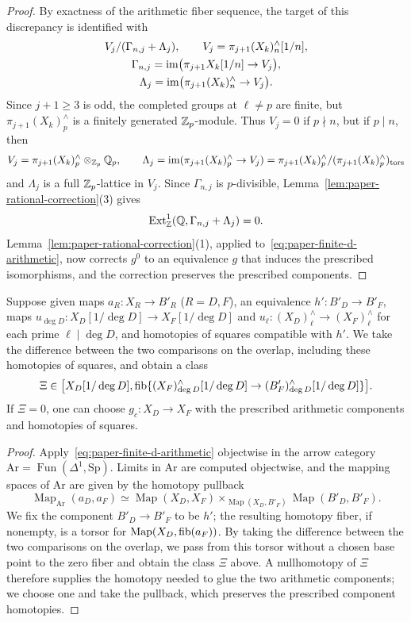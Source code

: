 \begin{proof}
By exactness of the arithmetic fiber sequence, the target of this discrepancy is identified with
\[
 \begin{gathered}
 V_j/(\Gamma_{n,j}+\Lambda_j),\qquad V_j=\pi_{j+1}(X_k)^\wedge_n[1/n],\\
 \Gamma_{n,j}=\operatorname{im}\bigl(\pi_{j+1}X_k[1/n]\to V_j\bigr),\\
 \Lambda_j=\operatorname{im}\bigl(\pi_{j+1}(X_k)^\wedge_n\to V_j\bigr).
 \end{gathered}
\]
Since $j+1\ge3$ is odd, the completed groups at $\ell\ne p$ are finite, but $\pi_{j+1}(X_k)^\wedge_p$ is a finitely generated $\mathbb Z_p$-module.
Thus $V_j=0$ if $p\nmid n$, but if $p\mid n$, then
\[
 V_j=\pi_{j+1}(X_k)^\wedge_p\otimes_{\mathbb Z_p}\mathbb Q_p,\qquad
 \Lambda_j=\operatorname{im}(\pi_{j+1}(X_k)^\wedge_p\to V_j)=\pi_{j+1}(X_k)^\wedge_p/(\pi_{j+1}(X_k)^\wedge_p)_{\mathrm{tors}}
\]
and $\Lambda_j$ is a full $\mathbb Z_p$-lattice in $V_j$.
Since $\Gamma_{n,j}$ is $p$-divisible, Lemma~\ref{lem:paper-rational-correction}(3) gives
\[
 \operatorname{Ext}^1_{\mathbb Z}(\mathbb Q,\Gamma_{n,j}+\Lambda_j)=0.
\]
Lemma~\ref{lem:paper-rational-correction}(1), applied to~\eqref{eq:paper-finite-d-arithmetic}, now corrects $g^0$ to an equivalence $g$ that induces the prescribed isomorphisms, and the correction preserves the prescribed components.
\end{proof}

\begin{lemma}
\label{lem:paper-arithmetic-arrow-gluing}
Suppose given maps $a_R\colon X_R\to B'_R$ ($R=D,F$), an equivalence $h'\colon B'_D\to B'_F$, maps $u_{\deg D}\colon X_D[1/\deg D]\to X_F[1/\deg D]$ and $u_\ell\colon(X_D)^\wedge_\ell\to (X_F)^\wedge_\ell$ for each prime $\ell\mid\deg D$, and homotopies of squares compatible with $h'$.
We take the difference between the two comparisons on the overlap, including these homotopies of squares, and obtain a class
\[
 \Xi\in
 \bigl[X_D[1/\deg D],\operatorname{fib}
       \{(X_F)^\wedge_{\deg D}[1/\deg D]\to (B'_F)^\wedge_{\deg D}[1/\deg D]\}\bigr].
\]
If $\Xi=0$, one can choose $g_c\colon X_D\to X_F$ with the prescribed arithmetic components and homotopies of squares.
\end{lemma}
\begin{proof}
Apply~\eqref{eq:paper-finite-d-arithmetic} objectwise in the arrow category $\mathrm{Ar}=\operatorname{Fun}(\Delta^1,\mathrm{Sp})$.
Limits in $\mathrm{Ar}$ are computed objectwise, and the mapping spaces of $\mathrm{Ar}$ are given by the homotopy pullback
\[
 \operatorname{Map}_{\mathrm{Ar}}(a_D,a_F)
 \simeq\operatorname{Map}(X_D,X_F)
 \mathop{\times}_{\operatorname{Map}(X_D,B'_F)}
                         \operatorname{Map}(B'_D,B'_F).
\]
We fix the component $B'_D\to B'_F$ to be $h'$; the resulting homotopy fiber, if nonempty, is a torsor for $\operatorname{Map}(X_D,\operatorname{fib}(a_F))$.
By taking the difference between the two comparisons on the overlap, we pass from this torsor without a chosen base point to the zero fiber and obtain the class $\Xi$ above.
A nullhomotopy of $\Xi$ therefore supplies the homotopy needed to glue the two arithmetic components; we choose one and take the pullback, which preserves the prescribed component homotopies.
\end{proof}

